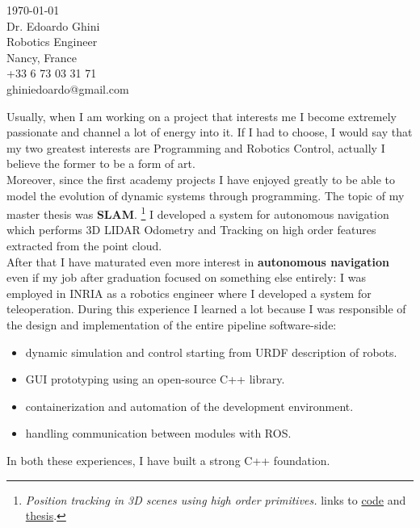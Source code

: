\documentclass[11pt]{article}
\newcommand{\company}{Airbus}
\begin{document}
\begin{FlushRight}
\today\\
\bigskip
{\sffamily Dr. Edoardo Ghini}\\
\textcolor{headings}{Robotics Engineer}\\
\medskip
Nancy, France\\
+33 6 73 03 31 71\\
ghiniedoardo@gmail.com
\end{FlushRight}

\begin{FlushLeft}


Usually, when I am working on a project that interests me
 I become extremely passionate and channel a lot of energy into it.
If I had to choose, I would say that my two greatest interests are
 Programming and Robotics Control, actually I believe the former to be a form of art.\\\smallskip
Moreover, since the first academy projects I have enjoyed greatly
  to be able to model the evolution of dynamic systems through programming.
  The topic of my master thesis was \textbf{SLAM}.
  \footnote{ \textit{Position tracking in 3D scenes using high order primitives.}
  \quad links to \href{https://github.com/dinies/3D-Lidar-Odometry-and-Tracking}{code} and 
  \href{https://github.com/dinies/MasterThesis-ArtificialIntelligence-Robotics/blob/master/MaterThesis_Edoardo_Ghini.pdf}
  {thesis}.}
I developed a system for autonomous navigation which performs
 3D LIDAR Odometry and Tracking on high order features extracted from the point cloud.\\\smallskip
After that I have maturated even more interest in \textbf{autonomous navigation }
 even if my job after graduation focused on something else entirely:
 I was employed in INRIA as a robotics engineer where I developed  a system for teleoperation.
During this experience I learned a lot because I was responsible
 of the design and implementation of the entire pipeline software-side:
\begin{itemize}
  \item  dynamic simulation and control starting from URDF description of robots.
  \item  GUI prototyping using an open-source C++ library.
  \item  containerization and automation of the development environment.
  \item  handling communication between modules with ROS.
\end{itemize}
In both these experiences, I have built a strong C++ foundation.\\\smallskip

\end{FlushLeft}
\end{document}
